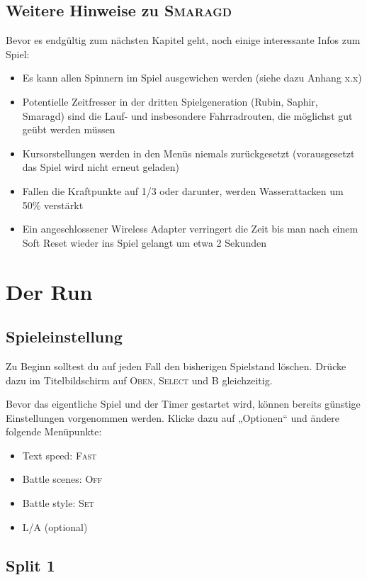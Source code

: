 \documentclass[11pt,a4paper,titlepage]{article}
\begin{document}
\subsection{Weitere Hinweise zu \textsc{Smaragd}}
\label{sec:additional_infos}
Bevor es endgültig zum nächsten Kapitel geht, noch einige interessante Infos zum Spiel:
\begin{itemize}
\item Es kann allen Spinnern im Spiel ausgewichen werden (siehe dazu Anhang x.x)
\item Potentielle Zeitfresser in der dritten Spielgeneration (Rubin, Saphir, Smaragd) sind die Lauf- und insbesondere Fahrradrouten, die möglichst gut geübt werden müssen
\item Kursorstellungen werden in den Menüs niemals zurückgesetzt (vorausgesetzt das Spiel wird nicht erneut geladen)
\item Fallen die Kraftpunkte auf 1/3 oder darunter, werden Wasserattacken um 50\% verstärkt
\item Ein angeschlossener Wireless Adapter verringert die Zeit bis man nach einem Soft Reset wieder ins Spiel gelangt um etwa 2 Sekunden
\end{itemize}



\section{Der Run}{
\subsection{Spieleinstellung}
Zu Beginn solltest du auf jeden Fall den bisherigen Spielstand löschen. Drücke dazu im Titelbildschirm auf \textsc{Oben}, \textsc{Select} und \textsc{B} gleichzeitig.

Bevor das eigentliche Spiel und der Timer gestartet wird, können bereits günstige Einstellungen vorgenommen werden. Klicke dazu auf „Optionen“ und ändere folgende Menüpunkte:
\begin{itemize}
\item Text speed: \textsc{Fast}
\item Battle scenes: \textsc{Off}
\item Battle style: \textsc{Set}
\item L/A (optional)
\end{itemize}
}

\subsection{Split 1}
\end{document}
